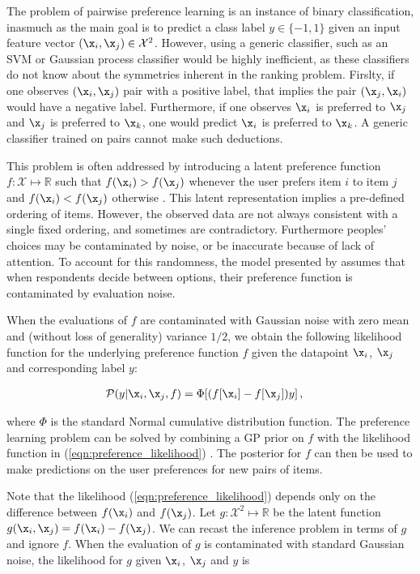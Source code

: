 The problem of pairwise preference learning is an instance of binary classification, inasmuch as the main goal is to predict a class label $y\in\{-1,1\}$ given an input feature vector $(\x_i,\x_j)\in\mathcal{X}^2$. However, using a generic classifier, such as an SVM or Gaussian process classifier would be highly inefficient, as these classifiers do not know about the symmetries inherent in the ranking problem. Firslty, if one observes $(\x_i,\x_j)$ pair with a positive label, that implies the pair $(\x_j,\x_i)$ would have a negative label. Furthermore, if one observes $\x_i$ is preferred to $\x_j$ and $\x_j$ is preferred to $\x_k$, one would predict $\x_i$ is preferred to $\x_k$. A generic classifier trained on pairs cannot make such deductions.

This problem is often addressed by introducing a latent preference function $f:\mathcal{X}\mapsto \mathbb{R}$ such that
$f(\x_i) > f(\x_j)$ whenever the user prefers item $i$ to item $j$ and $f(\x_i) < f(\x_j)$ otherwise \citep{Chu2005}. This latent representation implies a pre-defined ordering of items. However, the observed data are not always consistent with a single fixed ordering, and sometimes are contradictory. Furthermore peoples' choices may be contaminated by noise, or be inaccurate because of lack of attention. To account for this randomness, the model presented by \citep{Chu2005} assumes that when respondents decide between options, their preference function is contaminated by evaluation noise.

When the evaluations of $f$ are contaminated with Gaussian noise with zero mean and (without loss of generality) variance $1/2$, we obtain the following likelihood function for the underlying preference function $f$ given the datapoint $\x_i$, $\x_j$ and corresponding label $y$:

\begin{align}
\mathcal{P}(y|\x_i,\x_j,f) &= \Phi[(f[\x_i] - f[\x_j])y]\,,\label{eqn:preference_likelihood}
\end{align}

where $\Phi$ is the standard Normal cumulative distribution function. The preference learning problem can be solved by combining a GP prior on $f$ with the likelihood function in (\ref{eqn:preference_likelihood}) \citep{Chu2005}. The posterior for $f$ can
then be used to make predictions on the user preferences for new pairs of items.

Note that the likelihood (\ref{eqn:preference_likelihood}) depends only on the difference between $f(\x_i)$ and $f(\x_j)$.
Let $g:\mathcal{X}^2\mapsto\mathbb{R}$ be the latent function $g(\x_i,\x_j) = f(\x_i) - f(\x_j)$.
We can recast the inference problem in terms of $g$ and ignore $f$. When the evaluation of $g$ is contaminated with standard Gaussian noise, the likelihood for $g$ given $\x_i$, $\x_j$ and $y$ is

